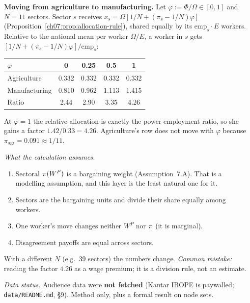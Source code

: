 \documentclass[../solutions_manual.tex]{subfiles}
\begin{document}
 \textbf{Moving from agriculture to manufacturing.} Let $\varphi := \Phi/\Omega \in [0,1]$ and $N = 11$ sectors. Sector $s$ receives $x_s = \Omega[1/N + (\pi_s - 1/N)\varphi]$ (Proposition~\ref{ch07:prop:allocation-rule}), shared equally by its $\text{emp}_s\cdot E$ workers. Relative to the national mean per worker $\Omega/E$, a worker in $s$ gets $[1/N + (\pi_s - 1/N)\varphi]/\text{emp}_s$:
\begin{center}
\begin{tabular}{lcccc}
\toprule
$\varphi$ & 0 & 0.25 & 0.5 & 1 \\
\midrule
Agriculture & 0.332 & 0.332 & 0.332 & 0.332 \\
Manufacturing & 0.810 & 0.962 & 1.113 & 1.415 \\
Ratio & 2.44 & 2.90 & 3.35 & 4.26 \\
\bottomrule
\end{tabular}
\end{center}
At $\varphi = 1$ the relative allocation is exactly the power-employment ratio, so she gains a factor $1.42/0.33 = 4.26$. Agriculture's row does not move with $\varphi$ because $\pi_{\text{agr}} = 0.091 \approx 1/11$.

\emph{What the calculation assumes.}
\begin{enumerate}
\item Sectoral $\pi(W^P)$ is a bargaining weight (Assumption~7.A). That is a modelling assumption, and this layer is the least natural one for it.
\item Sectors are the bargaining units and divide their share equally among workers.
\item One worker's move changes neither $W^P$ nor $\pi$ (it is marginal).
\item Disagreement payoffs are equal across sectors.
\end{enumerate}
With a different $N$ (e.g.\ 39 sectors) the numbers change. \emph{Common mistake:} reading the factor $4.26$ as a wage premium; it is a division rule, not an estimate.


\emph{Data status.} Audience data were \textbf{not fetched} (Kantar IBOPE is paywalled; \nolinkurl{data/README.md}, \S9). Method only, plus a formal result on node sets.
\end{document}
